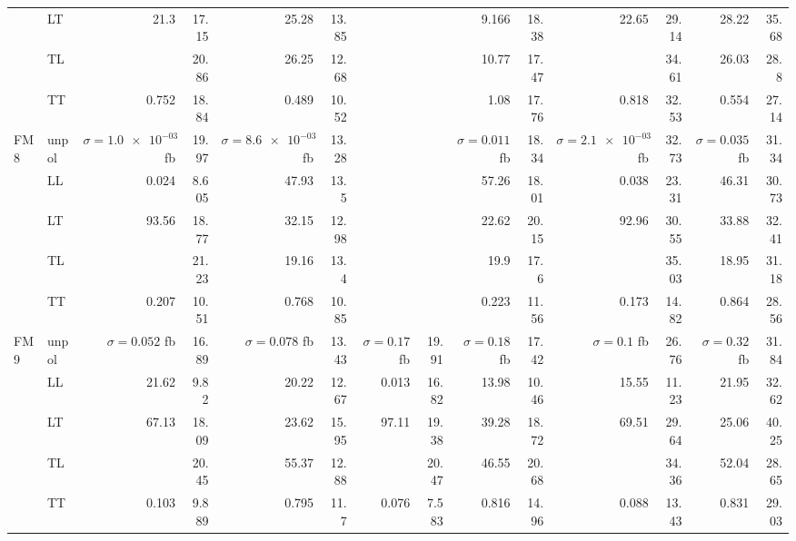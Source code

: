 \begin{table}[h]
{\begin{tabular}{llrrrrrrrrrrrr}
 & LT & \num{21.3} & \num{17.15} & \num{25.28} & \num{13.85} &  &  & \num{9.166} & \num{18.38} & \num{22.65} & \num{29.14} & \num{28.22} & \num{35.68} \\
 & TL &  & \num{20.86} & \num{26.25} & \num{12.68} &  &  & \num{10.77} & \num{17.47} &  & \num{34.61} & \num{26.03} & \num{28.8} \\
 & TT & \num{0.752} & \num{18.84} & \num{0.489} & \num{10.52} &  &  & \num{1.08} & \num{17.76} & \num{0.818} & \num{32.53} & \num{0.554} & \num{27.14} \\
\midrule
\multirow{5}{*}{FM8}
 & unpol & $\sigma = \num{1.0e-03}$ fb & \num{19.97} & $\sigma = \num{8.6e-03}$ fb & \num{13.28} &  &  & $\sigma = \num{0.011}$ fb & \num{18.34} & $\sigma = \num{2.1e-03}$ fb & \num{32.73} & $\sigma = \num{0.035}$ fb & \num{31.34} \\
 & LL & \num{0.024} & \num{8.605} & \num{47.93} & \num{13.5} &  &  & \num{57.26} & \num{18.01} & \num{0.038} & \num{23.31} & \num{46.31} & \num{30.73} \\
 & LT & \num{93.56} & \num{18.77} & \num{32.15} & \num{12.98} &  &  & \num{22.62} & \num{20.15} & \num{92.96} & \num{30.55} & \num{33.88} & \num{32.41} \\
 & TL &  & \num{21.23} & \num{19.16} & \num{13.4} &  &  & \num{19.9} & \num{17.6} &  & \num{35.03} & \num{18.95} & \num{31.18} \\
 & TT & \num{0.207} & \num{10.51} & \num{0.768} & \num{10.85} &  &  & \num{0.223} & \num{11.56} & \num{0.173} & \num{14.82} & \num{0.864} & \num{28.56} \\
\midrule
\multirow{5}{*}{FM9}
 & unpol & $\sigma = \num{0.052}$ fb & \num{16.89} & $\sigma = \num{0.078}$ fb & \num{13.43} & $\sigma = \num{0.17}$ fb & \num{19.91} & $\sigma = \num{0.18}$ fb & \num{17.42} & $\sigma = \num{0.1}$ fb & \num{26.76} & $\sigma = \num{0.32}$ fb & \num{31.84} \\
 & LL & \num{21.62} & \num{9.82} & \num{20.22} & \num{12.67} & \num{0.013} & \num{16.82} & \num{13.98} & \num{10.46} & \num{15.55} & \num{11.23} & \num{21.95} & \num{32.62} \\
 & LT & \num{67.13} & \num{18.09} & \num{23.62} & \num{15.95} & \num{97.11} & \num{19.38} & \num{39.28} & \num{18.72} & \num{69.51} & \num{29.64} & \num{25.06} & \num{40.25} \\
 & TL &  & \num{20.45} & \num{55.37} & \num{12.88} &  & \num{20.47} & \num{46.55} & \num{20.68} &  & \num{34.36} & \num{52.04} & \num{28.65} \\
 & TT & \num{0.103} & \num{9.889} & \num{0.795} & \num{11.7} & \num{0.076} & \num{7.583} & \num{0.816} & \num{14.96} & \num{0.088} & \num{13.43} & \num{0.831} & \num{29.03} \\
\bottomrule
\end{tabular}
}%
\end{table}